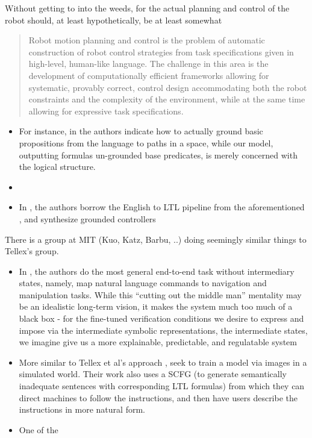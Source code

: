 \documentclass[a4paper, 11pt]{article}
\begin{document}
Without getting to into the weeds, for the actual planning and control of the
robot should, at least hypothetically, be at least somewhat 

\begin{quote}
  Robot motion planning and control is the problem of automatic construction of
robot control strategies from task specifications given in high-level, human-like language. The challenge
in this area is the development of computationally efficient frameworks allowing for systematic, provably
correct, control design accommodating both the robot constraints and the complexity of the environment,
while at the same time allowing for expressive task specifications.
\cite{4141034}
\end{quote}

\begin{itemize}
\item For instance, in \cite{plaku2016motion} the authors indicate how to actually
ground basic propositions from the language to paths in a space, while our
model, outputting formulas un-grounded base predicates, is merely concerned with
the logical structure.

\item 
\item In \cite{7759412}, the authors borrow the English to LTL pipeline from the
  aforementioned \cite{provCorrectNatControl}, and synthesize grounded controllers 
\end{itemize}

There is a group at MIT (Kuo, Katz, Barbu, ..) doing seemingly similar things to
Tellex's group.

\begin{itemize}
\item In \cite{kuo2020deep}, the authors do the most general end-to-end task
  without intermediary states,
  namely, map natural language commands to navigation and manipulation tasks.
  While this ``cutting out the middle man'' mentality may be an idealistic
  long-term vision, it makes the system much too much of a black box - for the
  fine-tuned verification conditions we desire to express and impose via the
  intermediate symbolic representations, the intermediate states, we imagine
  give us a more explainable, predictable, and regulatable system
\item More similar to Tellex et al's approach \cite{patellearning},
  \cite{ltlSemParse} seek to train a model via images in a simulated world.
  Their work also uses a SCFG (to generate semantically inadequate sentences
  with corresponding LTL formulas) from which they can direct machines to
  follow the instructions, and then have users describe the instructions in more
  natural form. 
\item One of the 
\end{itemize}



\printbibliography
\end{document}
